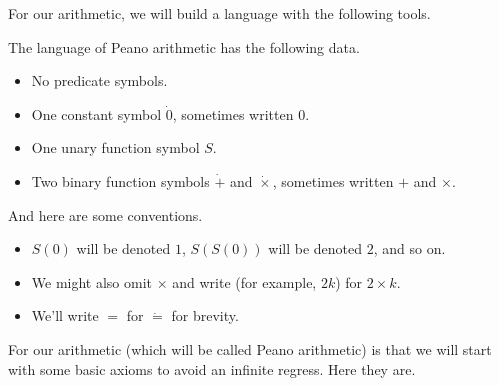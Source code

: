 \documentclass[../notes.tex]{subfiles}
\begin{document}
For our arithmetic, we will build a language with the following tools.
\begin{definition}
	The language of Peano arithmetic has the following data.
	\begin{itemize}
		\item No predicate symbols.
		\item One constant symbol $\dot0$, sometimes written $0$.
		\item One unary function symbol $S$.
		\item Two binary function symbols $\dot+$ and $\dot\times$, sometimes written $+$ and $\times$.
	\end{itemize}
\end{definition}
And here are some conventions.
\begin{itemize}
	\item $S(0)$ will be denoted $1$, $S(S(0))$ will be denoted $2$, and so on.
	\item We might also omit $\times$ and write (for example, $2k$) for $2\times k$.
	\item We'll write $=$ for $\dot=$ for brevity.
\end{itemize}
For our arithmetic (which will be called Peano arithmetic) is that we will start with some basic axioms to avoid an infinite regress. Here they are.
\end{document}
